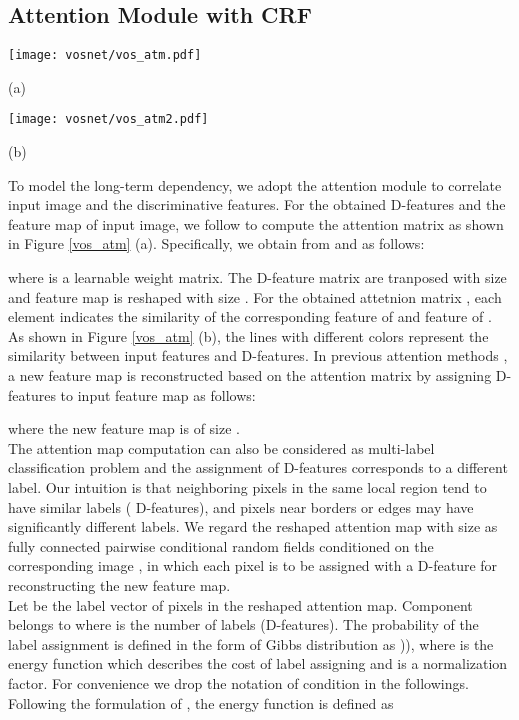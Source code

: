 \documentclass[runningheads]{llncs}
\begin{document}
\subsection{Attention Module with CRF}\label{sec_atm}
\begin{figure*}[t!]
	\begin{minipage}[t]{0.65\linewidth} 
		\centering
		\texttt{[image: vosnet/vos\_atm.pdf]}
		\centerline{(a)}
	\end{minipage}
	\begin{minipage}[t]{0.34\linewidth} 
		\centering
		\texttt{[image: vosnet/vos\_atm2.pdf]}
		\centerline{(b)}
	\end{minipage} 
	\caption{(a) Illustration of ATM. The input feature map and  D-features are correlated to model long-term dependency; (b)  Illustration of attention mechanism. The details are presented in Section \ref{sec_atm}.}
	\label{vos_atm}
\end{figure*}
To model the long-term dependency, we adopt the attention module to correlate input image and the discriminative features.  For the obtained  D-features  and the feature map  of input image, we follow \cite{vos_cosnet,vos_agnn} to compute the attention matrix  as shown in Figure \ref{vos_atm} (a). Specifically, we obtain  from  and  as follows:

where  is a learnable weight matrix. The  D-feature matrix  are tranposed with size  and feature map  is reshaped with size . For the obtained attetnion matrix , each element indicates the similarity of the corresponding feature of  and feature of . As shown in Figure \ref{vos_atm} (b), the lines with different colors represent the similarity between input features and  D-features. In previous attention methods \cite{vos_cosnet,vos_agnn,vos_andiff}, a new feature map is reconstructed based on the attention matrix by assigning  D-features to input feature map as follows:

where the new feature map  is of size . \\
\indent The attention map computation can also be considered as multi-label classification problem and the assignment of  D-features corresponds to a different label. Our intuition is that neighboring pixels in the same local region tend to have similar labels ( D-features), and pixels near borders or edges may have significantly different labels. We regard the reshaped attention map with size  as fully connected pairwise conditional random fields conditioned on the corresponding image , in which each pixel is to be assigned with a D-feature for reconstructing the new feature map.\\
\indent Let  be the label vector of  pixels in the reshaped attention map. Component  belongs to  where  is the number of labels (D-features). The probability of the label assignment is defined in the form of Gibbs distribution as )), where  is the energy function which describes the cost of label assigning and  is a normalization factor. For convenience we drop the notation of condition  in the followings. Following the formulation of  \cite{densecrf}, the energy function is defined as 
\end{document}

